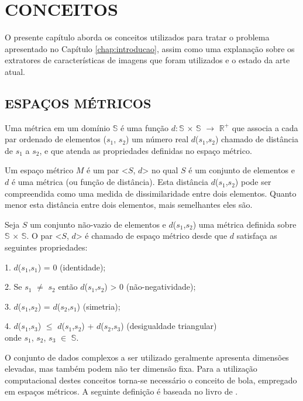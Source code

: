 \chapter{CONCEITOS}
\label{chap:conceitos}
O presente capítulo aborda os conceitos utilizados para tratar o problema apresentado no Capítulo \ref{chap:introducao}, assim como uma
explanação sobre os extratores de características de imagens que foram utilizados e o estado da arte atual.

\section{ESPAÇOS MÉTRICOS}
\label{sec:espmet}
Uma métrica em um domínio $\mathbb{S}$ é uma função $d:\mathbb{S}$ $\times$ $\mathbb{S}$ $\rightarrow$ $\mathbb{R^{+}}$ que associa a cada par 
ordenado de elementos ($s_1$, $s_2$) um número real $d$($s_1$,$s_2$) chamado de distância de $s_1$ a $s_2$, e que atenda
as propriedades definidas no espaço métrico\cite{Lima1977}.\par
Um espaço métrico $M$ é um par <$S$, $d$> no qual $S$ é um conjunto de elementos e $d$ é uma métrica
(ou função de distância). Esta distância $d$($s_1$,$s_2$) pode ser compreendida como uma medida de dissimilaridade entre dois elementos.
Quanto menor esta distância entre dois elementos, mais semelhantes eles são.
\begin{mydef}
 \label{def:espmet}
  Seja $S$ um conjunto não-vazio de elementos e $d$($s_1$,$s_2$) uma métrica definida sobre $\mathbb{S}$ $\times$ $\mathbb{S}$.
   O par <$S$, $d$> é chamado de espaço métrico desde que $d$ satisfaça as seguintes propriedades:\par
1. $d$($s_1$,$s_1$) = 0 (identidade);\par
2. Se $s_1$ $\neq$ $s_2$ ent\~ao $d$($s_1$,$s_2$) > 0 (n\~ao-negatividade);\par
3. $d$($s_1$,$s_2$) = $d$($s_2$,$s_1$) (simetria);\par
4. $d$($s_1$,$s_3$) $\leq$ $d$($s_1$,$s_2$) + $d$($s_2$,$s_3$) (desigualdade triangular)\\
onde $s_1$, $s_2$, $s_3$ $\in$ $\mathbb{S}$.
\end{mydef}
O conjunto de dados complexos a ser utilizado geralmente apresenta dimensões elevadas, mas também podem não ter dimensão fixa. Para a utilização computacional destes conceitos torna-se necessário o conceito de bola,
empregado em espaços métricos. A seguinte definição é baseada no livro de \cite{Shirali2005}.

